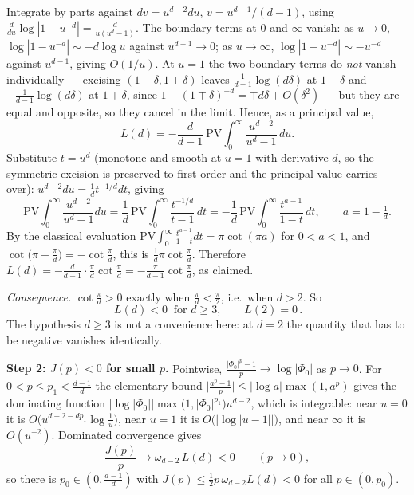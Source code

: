 \documentclass[11pt,reqno]{amsart}
\theoremstyle{plain}
\theoremstyle{definition}
\theoremstyle{plain}
\theoremstyle{definition}
\theoremstyle{remark}
\begin{document}
\begin{filled}
Integrate by parts against $dv=u^{d-2}du$, $v=u^{d-1}/(d-1)$, using
$\frac{d}{du}\log|1-u^{-d}|=\frac{d}{u(u^d-1)}$. The boundary terms at $0$ and
$\infty$ vanish: as $u\to0$, $\log|1-u^{-d}|\sim-d\log u$ against $u^{d-1}\to0$; as
$u\to\infty$, $\log|1-u^{-d}|\sim-u^{-d}$ against $u^{d-1}$, giving $O(1/u)$. At
$u=1$ the two boundary terms do \emph{not} vanish individually --- excising
$(1-\delta,1+\delta)$ leaves $\frac{1}{d-1}\log(d\delta)$ at $1-\delta$ and
$-\frac{1}{d-1}\log(d\delta)$ at $1+\delta$, since
$1-(1\mp\delta)^{-d}=\mp d\delta+O(\delta^2)$ --- but they are equal and opposite, so
they cancel in the limit. Hence, as a principal value,
\[L(d)=-\frac{d}{d-1}\ \mathrm{PV}\!\!\int_0^\infty\frac{u^{d-2}}{u^{d}-1}\,du .\]
Substitute $t=u^d$ (monotone and smooth at $u=1$ with derivative $d$, so the
symmetric excision is preserved to first order and the principal value carries over):
$u^{d-2}du=\frac1d t^{-1/d}dt$, giving
\[\mathrm{PV}\!\!\int_0^\infty\frac{u^{d-2}}{u^{d}-1}du
 =\frac1d\,\mathrm{PV}\!\!\int_0^\infty\frac{t^{-1/d}}{t-1}\,dt
 =-\frac1d\,\mathrm{PV}\!\!\int_0^\infty\frac{t^{a-1}}{1-t}\,dt,\qquad a=1-\tfrac1d .\]
By the classical evaluation $\mathrm{PV}\int_0^\infty\frac{t^{a-1}}{1-t}dt=\pi\cot(\pi a)$
for $0<a<1$, and $\cot\bigl(\pi-\frac\pi d\bigr)=-\cot\frac\pi d$, this is
$\frac1d\pi\cot\frac\pi d$. Therefore
$L(d)=-\frac{d}{d-1}\cdot\frac{\pi}{d}\cot\frac{\pi}{d}
     =-\frac{\pi}{d-1}\cot\frac{\pi}{d}$, as claimed.

\emph{Consequence.} $\cot\frac\pi d>0$ exactly when $\frac\pi d<\frac\pi2$, i.e.\ when
$d>2$. So
\[\boxed{\,L(d)<0\ \text{ for } d\ge3,\qquad L(2)=0\,.}\]
The hypothesis $d\ge3$ is not a convenience here: at $d=2$ the quantity that has to be
negative vanishes identically.

\medskip
\noindent\textbf{Step 2: $J(p)<0$ for small $p$.} Pointwise,
$\frac{|\Phi_0|^p-1}{p}\to\log|\Phi_0|$ as $p\to0$. For $0<p\le p_1<\frac{d-1}{d}$ the
elementary bound $\bigl|\frac{a^p-1}{p}\bigr|\le|\log a|\max(1,a^p)$ gives the
dominating function
$\bigl|\log|\Phi_0|\bigr|\max\bigl(1,|\Phi_0|^{p_1}\bigr)u^{d-2}$, which is integrable:
near $u=0$ it is $O\bigl(u^{d-2-dp_1}\log\frac1u\bigr)$, near $u=1$ it is
$O\bigl(|\log|u-1||\bigr)$, and near $\infty$ it is $O(u^{-2})$. Dominated convergence
gives
\[\frac{J(p)}{p}\longrightarrow \omega_{d-2}\,L(d)<0\qquad(p\to0),\]
so there is $p_0\in(0,\frac{d-1}{d})$ with
$J(p)\le\tfrac12 p\,\omega_{d-2}L(d)<0$ for all $p\in(0,p_0)$.


\end{filled}
\end{document}
